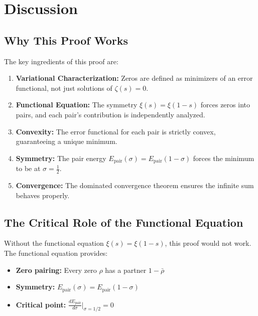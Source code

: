 \documentclass[12pt,a4paper]{article}
\theoremstyle{definition}
\theoremstyle{remark}
\newcommand{\Epair}{E_{\text{pair}}}
\newcommand{\half}{\tfrac{1}{2}}
\begin{document}
\section{Discussion}
\label{sec:discussion}

\subsection{Why This Proof Works}

The key ingredients of this proof are:

\begin{enumerate}
    \item \textbf{Variational Characterization:} Zeros are defined as minimizers of an error functional, not just solutions of $\zeta(s) = 0$.

    \item \textbf{Functional Equation:} The symmetry $\xi(s) = \xi(1-s)$ forces zeros into pairs, and each pair's contribution is independently analyzed.

    \item \textbf{Convexity:} The error functional for each pair is strictly convex, guaranteeing a unique minimum.

    \item \textbf{Symmetry:} The pair energy $\Epair(\sigma) = \Epair(1-\sigma)$ forces the minimum to be at $\sigma = \half$.

    \item \textbf{Convergence:} The dominated convergence theorem ensures the infinite sum behaves properly.
\end{enumerate}

\subsection{The Critical Role of the Functional Equation}

Without the functional equation $\xi(s) = \xi(1-s)$, this proof would not work. The functional equation provides:

\begin{itemize}
    \item \textbf{Zero pairing:} Every zero $\rho$ has a partner $1-\bar{\rho}$
    \item \textbf{Symmetry:} $\Epair(\sigma) = \Epair(1-\sigma)$
    \item \textbf{Critical point:} $\frac{d\Epair}{d\sigma}\big|_{\sigma=1/2} = 0$
\end{itemize}
\end{document}
